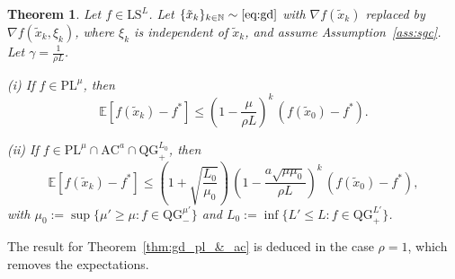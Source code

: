 \documentclass{article}
\def\N{{\mathbb{N}}}
\def\xdisctilde{\{\tilde{x}_k \}_{k\in \N}}
\def\pl{{\text{PL}^\mu}}
\newcommand{\bpar}[1]{\left(#1\right)}
\newcommand{\E}[1]{\mathbb{E}\left[#1 \right]}
\newcommand{\ls}{\text{LS}^{L}}
\newcommand{\ac}{\text{AC}^{a}}
\newcommand{\qg}{\text{QG}_{+}^{L_0}}
\newcommand{\qgf}[1]{\text{QG}_{+}^{#1}}
\newcommand{\qginff}[1]{\text{QG}_{-}^{#1}}
\theoremstyle{plain}
\newtheorem{theorem}{Theorem}[section]
\theoremstyle{definition}
\theoremstyle{remark}
\begin{document}
\begin{theorem}\label{thm:sto_gd_pl_&_ac}
Let $f \in \ls$. Let $\xdisctilde \sim \eqref{eq:gd}$ with $\nabla f(\tilde x_k)$ replaced by
$\nabla f(\tilde x_k,\xi_k)$, where $\xi_k$ is independent of $\tilde x_k$, and assume Assumption~\ref{ass:sgc}.
Let $\gamma = \frac{1}{\rho L}$.

(i) If $f \in \pl$, then
\[
\E{ f(\tilde x_k)-f^\ast} \le \bpar{1-\frac{\mu}{\rho L}}^k\,(f(\tilde x_0)-f^\ast).
\]

(ii) If $f \in \pl \cap \ac \cap \qg$, then
\[
\E{f(\tilde x_k)-f^\ast}
\le
\bpar{1+\sqrt{\frac{L_0}{\mu_0}}}\,
\bpar{1-\frac{a\sqrt{\mu \mu_0}}{\rho L}}^k\,(f(\tilde x_0)-f^\ast),
\]
with $\mu_0 := \sup\{\mu' \ge \mu: f \in \qginff{\mu'}\}$ and
$L_0 :=\inf\{L' \le  L:f \in \qgf{L'}\}$.
\end{theorem}



The result for Theorem~\ref{thm:gd_pl_&_ac} is deduced in the case $\rho =1$, which removes the expectations. 
\end{document}
